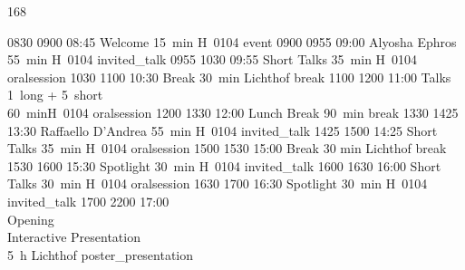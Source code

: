 \setslotsize{3cm}{1.3mm}
 {168}
\settextframe{1.5mm}
\setbottomspace{0pt}
\begin{timetable}
   {0830} {0900} {08:45 Welcome}                      {\vspace{1.5mm}15~min}          {\vspace{1.5mm}H~0104}        {event}
   {0900} {0955} {09:00 Alyosha Ephros}               {55~min}                        {H~0104}                      {invited_talk}
   {0955} {1030} {09:55 Short Talks}                  {\vspace{1.5mm}35~min}          {\vspace{1.5mm}H~0104}        {oralsession}
   {1030} {1100} {10:30 Break}                        {\vspace{1.5mm}30~min}          {\vspace{1.5mm}Lichthof}      {break}
   {1100} {1200} {11:00 Talks}                        {\vspace{-0.5em}1~long + 5~short\\60~min}{H~0104}             {oralsession}
   {1200} {1330} {12:00 Lunch Break}                  {90~min}                        {}                            {break}
   {1330} {1425} {13:30 Raffaello D'Andrea}           {55~min}                        {H~0104}                      {invited_talk}
   {1425} {1500} {14:25 Short Talks} 		          {\vspace{1.5mm}35~min}          {\vspace{1.5mm}H~0104}        {oralsession}
   {1500} {1530} {15:00 Break}                        {\vspace{1.5mm}30 min}          {\vspace{1.5mm}Lichthof}      {break}
   {1530} {1600} {15:30 Spotlight}  			      {\vspace{1.5mm}30~min}          {\vspace{1.5mm}H~0104}        {invited_talk}
   {1600} {1630} {16:00 Short Talks}                  {\vspace{1.5mm}30~min}          {\vspace{1.5mm}H~0104}        {oralsession}
   {1630} {1700} {16:30 Spotlight}  	              {\vspace{1.5mm}30~min}          {\vspace{1.5mm}H~0104}        {invited_talk}
   {1700} {2200} {17:00\\[0.2em]Opening\\\vspace{0.3em}Interactive Presentation\\\vspace{4.5em}{\footnotesize Interactive Food at 19:00}}      
                                                              {5~h}                            {Lichthof}                      {poster_presentation}



\end{timetable}
